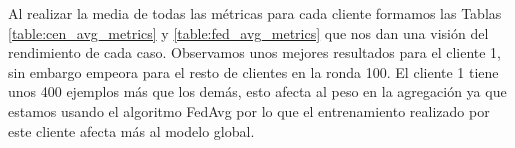 \begin{table}[!htp]
	\centering
	
	\caption{Métricas promedio en la ronda 100 para el caso federado}
	\label{table:fed_avg_metrics}
\end{table}

Al realizar la media de todas las métricas para cada cliente formamos las Tablas \ref{table:cen_avg_metrics} y \ref{table:fed_avg_metrics} que nos dan una visión del rendimiento de cada caso. Observamos unos mejores resultados para el cliente 1, sin embargo empeora para el resto de clientes en la ronda 100. El cliente 1 tiene unos 400 ejemplos más que los demás, esto afecta al peso en la agregación ya que estamos usando el algoritmo FedAvg por lo que el entrenamiento realizado por este cliente afecta más al modelo global.

\cleardoublepage